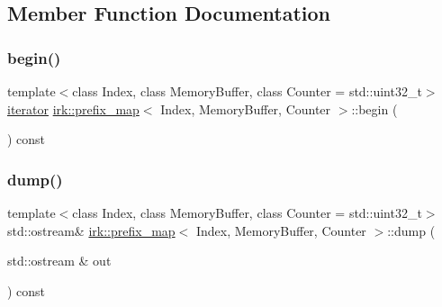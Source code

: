 \subsection{Member Function Documentation}
\mbox{\label{classirk_1_1prefix__map_a865e7acbf722c38d76287d4b47cf3e38}} 
\subsubsection{\texorpdfstring{begin()}{begin()}}
{\footnotesize\ttfamily template$<$class Index, class Memory\+Buffer, class Counter = std\+::uint32\+\_\+t$>$ \\
\mbox{\hyperlink{classirk_1_1prefix__map_1_1iterator}{iterator}} \mbox{\hyperlink{classirk_1_1prefix__map}{irk\+::prefix\+\_\+map}}$<$ Index, Memory\+Buffer, Counter $>$\+::begin (\begin{DoxyParamCaption}{ }\end{DoxyParamCaption}) const\hspace{0.3cm}{\ttfamily [inline]}}

\mbox{\label{classirk_1_1prefix__map_a169d893870da9dbb102a9f000ef32d3c}} 
\subsubsection{\texorpdfstring{dump()}{dump()}}
{\footnotesize\ttfamily template$<$class Index, class Memory\+Buffer, class Counter = std\+::uint32\+\_\+t$>$ \\
std\+::ostream\& \mbox{\hyperlink{classirk_1_1prefix__map}{irk\+::prefix\+\_\+map}}$<$ Index, Memory\+Buffer, Counter $>$\+::dump (\begin{DoxyParamCaption}\item[{std\+::ostream \&}]{out }\end{DoxyParamCaption}) const\hspace{0.3cm}{\ttfamily [inline]}}

\mbox{\label{classirk_1_1prefix__map_a2e4677738f2a2a9eb6593e767d2d6a9e}} 
